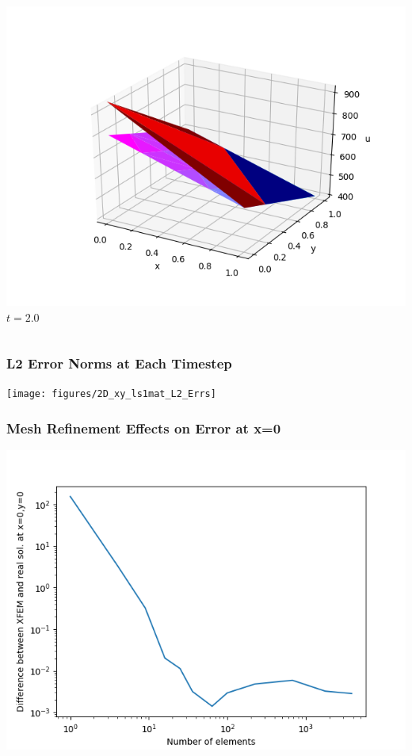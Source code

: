 \documentclass[]{beamer}
\begin{document}
\begin{frame}[t]
\begin{columns}
\begin{center}
			\includegraphics[scale=0.17]{figures/2D_xy_ls1mat_u_vs_x_20}\\
			$t=2.0$
			\end{center}
	\end{columns}
\end{frame}

\begin{frame}[t]\frametitle{L2 Error Norms at Each Timestep}
	\begin{center}
		\texttt{[image: figures/2D\_xy\_ls1mat\_L2\_Errs]}
	\end{center}
\end{frame}

\begin{frame}[t]\frametitle{Mesh Refinement Effects on Error at x=0}
	\begin{center}
		\includegraphics[scale=0.4]{figures/2D_xy_ls1mat_neumann_comp}
	\end{center}
\end{frame}
\end{document}

